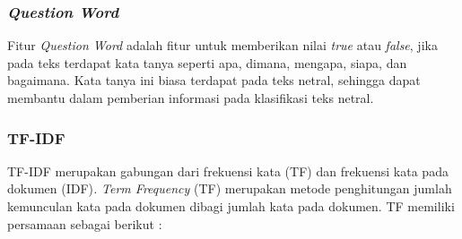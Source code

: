 \subsubsection{\textit{Question Word}}
Fitur \textit{Question Word }adalah fitur untuk memberikan nilai 
\textit{true }atau \textit{false}, jika pada teks terdapat kata 
tanya seperti apa, dimana, mengapa, siapa, dan bagaimana. Kata tanya ini 
biasa terdapat pada teks netral, sehingga dapat membantu dalam pemberian 
informasi pada klasifikasi teks netral.
\subsubsection{TF-IDF}
TF-IDF\textit{ }merupakan gabungan dari frekuensi kata (TF) dan 
frekuensi kata pada dokumen (IDF)\textit{.} \textit{Term Frequency} 
(TF) merupakan metode penghitungan jumlah kemunculan kata pada dokumen 
dibagi jumlah kata pada dokumen. TF memiliki persamaan sebagai berikut 
\cite{15}:

